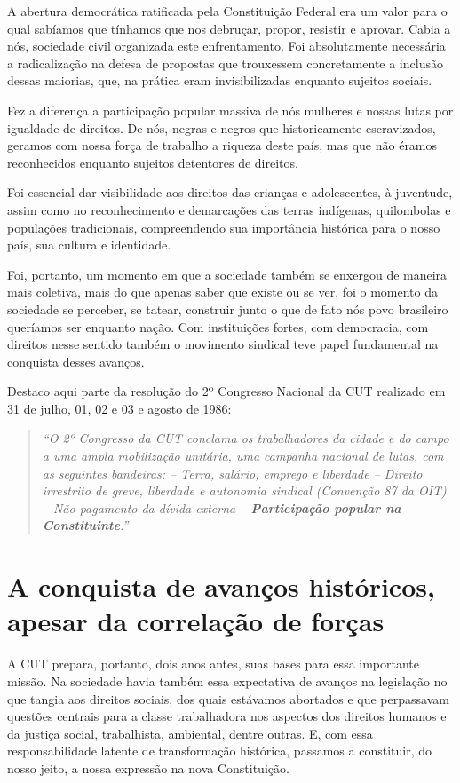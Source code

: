 A abertura democrática ratificada pela Constituição Federal era um valor
para o qual sabíamos que tínhamos que nos debruçar, propor, resistir e
aprovar. Cabia a nós, sociedade civil organizada este enfrentamento. Foi
absolutamente necessária a radicalização na defesa de propostas que
trouxessem concretamente a inclusão dessas maiorias, que, na prática
eram invisibilizadas enquanto sujeitos sociais.

Fez a diferença a participação popular massiva de nós mulheres e nossas
lutas por igualdade de direitos. De nós, negras e negros que
historicamente escravizados, geramos com nossa força de trabalho a
riqueza deste país, mas que não éramos reconhecidos enquanto sujeitos
detentores de direitos.

Foi essencial dar visibilidade aos direitos das crianças e adolescentes,
à juventude, assim como no reconhecimento e demarcações das terras
indígenas, quilombolas e populações tradicionais, compreendendo sua
importância histórica para o nosso país, sua cultura e identidade.

Foi, portanto, um momento em que a sociedade também se enxergou de
maneira mais coletiva, mais do que apenas saber que existe ou se ver,
foi o momento da sociedade se perceber, se tatear, construir junto o que
de fato nós povo brasileiro queríamos ser enquanto nação. Com
instituições fortes, com democracia, com direitos nesse sentido também o
movimento sindical teve papel fundamental na conquista desses avanços.

Destaco aqui parte da resolução do 2º Congresso Nacional da CUT
realizado em 31 de julho, 01, 02 e 03 e agosto de 1986:

\begin{quote}
\emph{``O 2º Congresso da CUT conclama os trabalhadores da cidade e do
campo a uma ampla mobilização unitária, uma campanha nacional de lutas,
com as seguintes bandeiras: -- Terra, salário, emprego e liberdade --
Direito irrestrito de greve, liberdade e autonomia sindical (Convenção
87 da OIT) -- Não pagamento da dívida externa -- \textbf{Participação
popular na Constituinte}.'' }
\end{quote}

\section{A conquista de avanços históricos, apesar da correlação de
forças}

A CUT prepara, portanto, dois anos antes, suas bases para essa
importante missão. Na sociedade havia também essa expectativa de avanços
na legislação no que tangia aos direitos sociais, dos quais estávamos
abortados e que perpassavam questões centrais para a classe trabalhadora
nos aspectos dos direitos humanos e da justiça social, trabalhista,
ambiental, dentre outras. E, com essa responsabilidade latente de
transformação histórica, passamos a constituir, do nosso jeito, a nossa
expressão na nova Constituição.


